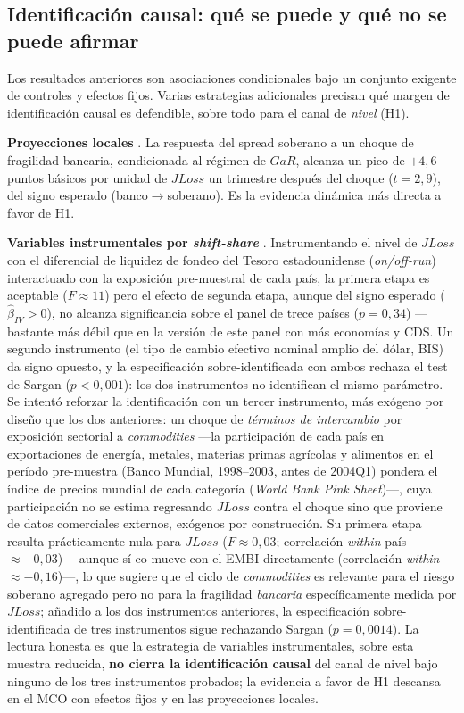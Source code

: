 \subsection{Identificación causal: qué se puede y qué no se puede afirmar}\label{sec:ident-causal}

Los resultados anteriores son asociaciones condicionales bajo un conjunto exigente de controles y efectos fijos. Varias estrategias adicionales precisan qué margen de identificación causal es defendible, sobre todo para el canal de \emph{nivel} (H1).

\textbf{Proyecciones locales} \citep{Jorda2005}. La respuesta del spread soberano a un choque de fragilidad bancaria, condicionada al régimen de $GaR$, alcanza un pico de $+4{,}6$ puntos básicos por unidad de $JLoss$ un trimestre después del choque ($t=2{,}9$), del signo esperado (banco$\to$soberano). Es la evidencia dinámica más directa a favor de H1.

\textbf{Variables instrumentales por \textit{shift-share}} \citep{GoldsmithPinkhamSorkinSwift2020}. Instrumentando el nivel de $JLoss$ con el diferencial de liquidez de fondeo del Tesoro estadounidense (\textit{on/off-run}) interactuado con la exposición pre-muestral de cada país, la primera etapa es aceptable ($F\approx11$) pero el efecto de segunda etapa, aunque del signo esperado ($\hat\beta_{IV}>0$), no alcanza significancia sobre el panel de trece países ($p=0{,}34$) —bastante más débil que en la versión de este panel con más economías y CDS. Un segundo instrumento (el tipo de cambio efectivo nominal amplio del dólar, BIS) da signo opuesto, y la especificación sobre-identificada con ambos rechaza el test de Sargan ($p<0{,}001$): los dos instrumentos no identifican el mismo parámetro. Se intentó reforzar la identificación con un tercer instrumento, más exógeno por diseño que los dos anteriores: un choque de \emph{términos de intercambio} por exposición sectorial a \textit{commodities} —la participación de cada país en exportaciones de energía, metales, materias primas agrícolas y alimentos en el período pre-muestra (Banco Mundial, 1998--2003, antes de 2004Q1) pondera el índice de precios mundial de cada categoría (\textit{World Bank Pink Sheet})—, cuya participación no se estima regresando $JLoss$ contra el choque sino que proviene de datos comerciales externos, exógenos por construcción. Su primera etapa resulta prácticamente nula para $JLoss$ ($F\approx0{,}03$; correlación \textit{within}-país $\approx-0{,}03$) —aunque sí co-mueve con el EMBI directamente (correlación \textit{within} $\approx-0{,}16$)—, lo que sugiere que el ciclo de \textit{commodities} es relevante para el riesgo soberano agregado pero no para la fragilidad \emph{bancaria} específicamente medida por $JLoss$; añadido a los dos instrumentos anteriores, la especificación sobre-identificada de tres instrumentos sigue rechazando Sargan ($p=0{,}0014$). La lectura honesta es que la estrategia de variables instrumentales, sobre esta muestra reducida, \textbf{no cierra la identificación causal} del canal de nivel bajo ninguno de los tres instrumentos probados; la evidencia a favor de H1 descansa en el MCO con efectos fijos y en las proyecciones locales.

